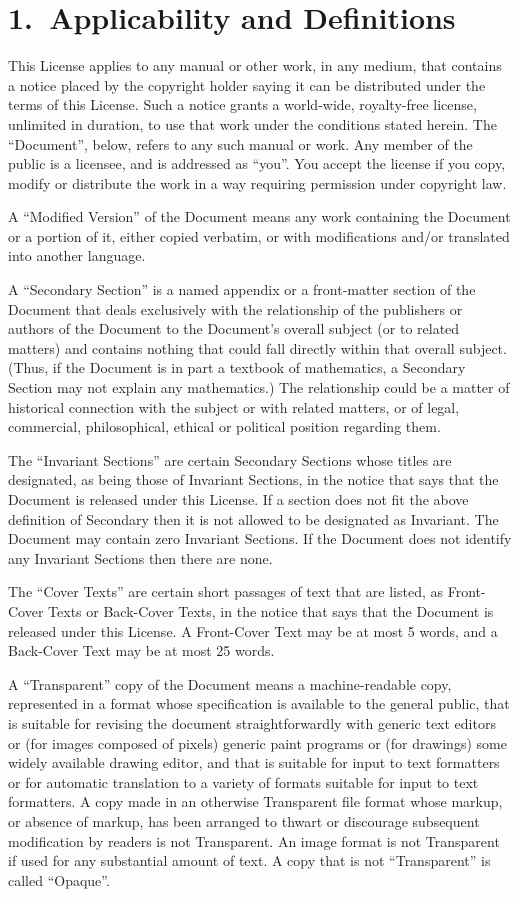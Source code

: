 \section*{1.\ Applicability and Definitions}

This License applies to any manual or other work, in any medium, that
contains a notice placed by the copyright holder saying it can be
distributed under the terms of this License. Such a notice grants a
world-wide, royalty-free license, unlimited in duration, to use that
work under the conditions stated herein. The ``Document'', below,
refers to any such manual or work. Any member of the public is a
licensee, and is addressed as ``you''. You accept the license if you
copy, modify or distribute the work in a way requiring permission
under copyright law.

A ``Modified Version'' of the Document means any work containing the
Document or a portion of it, either copied verbatim, or with
modifications and/or translated into another language.

A ``Secondary Section'' is a named appendix or a front-matter section
of the Document that deals exclusively with the relationship of the
publishers or authors of the Document to the Document's overall
subject (or to related matters) and contains nothing that could fall
directly within that overall subject. (Thus, if the Document is in
part a textbook of mathematics, a Secondary Section may not explain
any mathematics.)  The relationship could be a matter of historical
connection with the subject or with related matters, or of legal,
commercial, philosophical, ethical or political position regarding
them.

The ``Invariant Sections'' are certain Secondary Sections whose titles
are designated, as being those of Invariant Sections, in the notice
that says that the Document is released under this License. If a
section does not fit the above definition of Secondary then it is not
allowed to be designated as Invariant. The Document may contain zero
Invariant Sections. If the Document does not identify any Invariant
Sections then there are none.

The ``Cover Texts'' are certain short passages of text that are
listed, as Front-Cover Texts or Back-Cover Texts, in the notice that
says that the Document is released under this License. A Front-Cover
Text may be at most 5 words, and a Back-Cover Text may be at most 25
words.

A ``Transparent'' copy of the Document means a machine-readable copy,
represented in a format whose specification is available to the
general public, that is suitable for revising the document
straightforwardly with generic text editors or (for images composed of
pixels) generic paint programs or (for drawings) some widely available
drawing editor, and that is suitable for input to text formatters or
for automatic translation to a variety of formats suitable for input
to text formatters. A copy made in an otherwise Transparent file
format whose markup, or absence of markup, has been arranged to thwart
or discourage subsequent modification by readers is not Transparent.
An image format is not Transparent if used for any substantial amount
of text. A copy that is not ``Transparent'' is called ``Opaque''.

